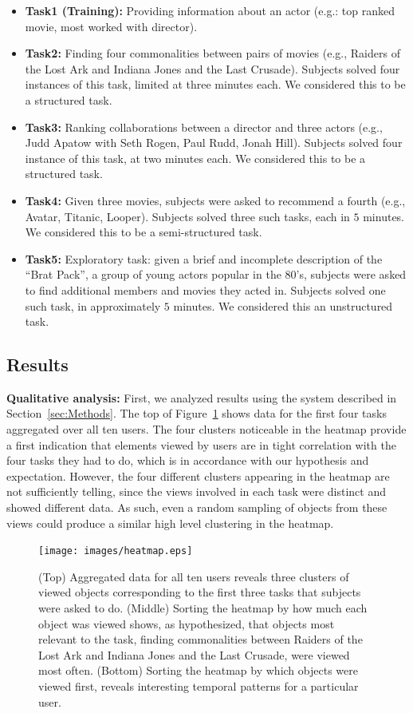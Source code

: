 \begin{itemize}
	\item \textbf{Task1 (Training):} Providing information about an actor (e.g.: top ranked movie, most worked with director).
	\item \textbf{Task2:} Finding four commonalities between pairs of movies (e.g., Raiders of the Lost Ark and Indiana Jones and the Last Crusade). Subjects solved four instances of this task, limited at three minutes each.  We considered this to be a structured task.
	\item \textbf{Task3:} Ranking collaborations between a director and three actors (e.g., Judd Apatow with Seth Rogen, Paul Rudd, Jonah Hill). Subjects solved four instance of this task, at two minutes each. We considered this to be a structured task.
	\item \textbf{Task4:} Given three movies, subjects were asked to recommend a fourth (e.g., Avatar, Titanic, Looper). Subjects solved three such tasks, each in $5$ minutes. We considered this to be a semi-structured task.
	\item \textbf{Task5:} Exploratory task: given a brief and incomplete description of the ``Brat Pack'', a group of young actors popular in the 80's, subjects were asked to find additional members and movies they acted in. Subjects solved one such task, in approximately $5$ minutes. We considered this an unstructured task.
\end{itemize}


\subsection{Results}
\label{sec:EvalResults}
\textbf{Qualitative analysis: } First, we analyzed results using the system described in Section~\ref{sec:Methods}. The top of Figure~\ref{fig:heatmap} shows data for the first four tasks aggregated over all ten users. The four clusters noticeable in the heatmap provide a first indication that elements viewed by users are in tight correlation with the four tasks they had to do, which is in accordance with our hypothesis and expectation. However, the four different clusters appearing in the heatmap are not sufficiently telling, since the views involved in each task were distinct and showed different data. As such, even a random sampling of objects from these views could produce a similar high level clustering in the heatmap. 

\begin{figure}[htb]
  \centering
  \texttt{[image: images/heatmap.eps]}
  \caption{(Top) Aggregated data for all ten users reveals three clusters of viewed objects corresponding to the first three tasks that subjects were asked to do. (Middle) Sorting the heatmap by how much each object was viewed shows, as hypothesized, that objects most relevant to the task, finding commonalities between Raiders of the Lost Ark and Indiana Jones and the Last Crusade, were viewed most often. (Bottom) Sorting the heatmap by which objects were viewed first, reveals interesting temporal patterns for a particular user. }
	\label{fig:heatmap}
\end{figure}

